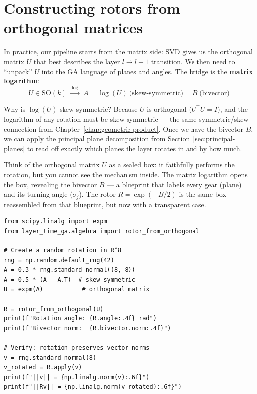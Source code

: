 \documentclass[11pt, twoside, openright]{memoir}
\numberwithin{equation}{chapter}
\begin{document}
\section{Constructing rotors from orthogonal matrices}
\label{sec:matrix-to-rotor}

In practice, our pipeline starts from the matrix side: SVD gives us the
orthogonal matrix $U$ that best describes the layer $l \to l+1$
transition.  We then need to ``unpack'' $U$ into the GA language of
planes and angles.  The bridge is the \textbf{matrix logarithm}:
\begin{equation}
\label{eq:log-bridge}
  U \in \mathrm{SO}(k) \;\xrightarrow{\;\log\;}\; A = \log(U) \;\text{(skew-symmetric)} = B \;\text{(bivector)}
\end{equation}

Why is $\log(U)$ skew-symmetric?  Because $U$ is orthogonal
($U^\top U = I$), and the logarithm of any rotation must be
skew-symmetric --- the same symmetric/skew connection from
Chapter~\ref{chap:geometric-product}.  Once we have the bivector $B$,
we can apply the principal plane decomposition from
Section~\ref{sec:principal-planes} to read off exactly which planes the
layer rotates in and by how much.

\begin{analogy}
Think of the orthogonal matrix $U$ as a sealed box: it faithfully
performs the rotation, but you cannot see the mechanism inside.  The
matrix logarithm opens the box, revealing the bivector $B$ --- a
blueprint that labels every gear (plane) and its turning angle
($\sigma_j$).  The rotor $R = \exp(-B/2)$ is the same box reassembled
from that blueprint, but now with a transparent case.
\end{analogy}

\begin{lstlisting}[caption={From orthogonal matrix to rotor}]
from scipy.linalg import expm
from layer_time_ga.algebra import rotor_from_orthogonal

# Create a random rotation in R^8
rng = np.random.default_rng(42)
A = 0.3 * rng.standard_normal((8, 8))
A = 0.5 * (A - A.T)  # skew-symmetric
U = expm(A)           # orthogonal matrix

R = rotor_from_orthogonal(U)
print(f"Rotation angle: {R.angle:.4f} rad")
print(f"Bivector norm:  {R.bivector.norm:.4f}")

# Verify: rotation preserves vector norms
v = rng.standard_normal(8)
v_rotated = R.apply(v)
print(f"||v|| = {np.linalg.norm(v):.6f}")
print(f"||Rv|| = {np.linalg.norm(v_rotated):.6f}")
\end{lstlisting}
\end{document}
